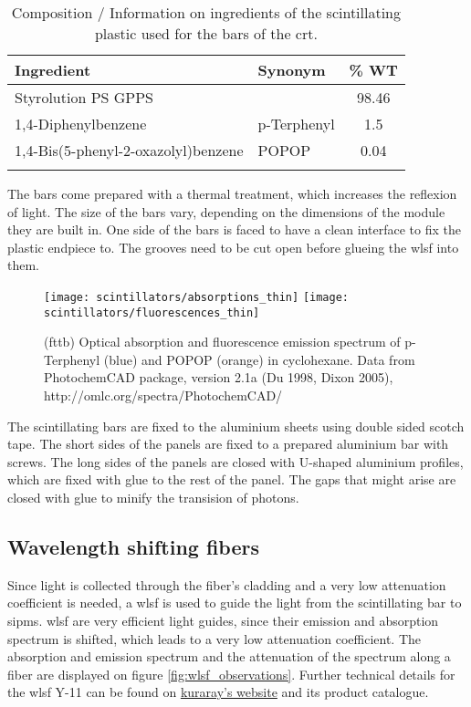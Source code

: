 \begin{table}
  \centering
  \begin{tabular}{ l l c }
    Ingredient                          & Synonym     & \% WT \\
    \hline
    Styrolution PS GPPS                 &             & 98.46 \\
    1,4-Diphenylbenzene                 & p-Terphenyl & 1.5   \\
    1,4-Bis(5-phenyl-2-oxazolyl)benzene & POPOP       & 0.04  \\
    \hline
    \\
  \end{tabular}
  \caption{%
    Composition / Information on ingredients of the scintillating plastic used for the bars of the \gls{crt}.
  }
  \label{tab:material_safety_data_sheet}
\end{table}

The bars come prepared with a thermal treatment, which increases the reflexion of light.
The size of the bars vary, depending on the dimensions of the module they are built in.
One side of the bars is faced to have a clean interface to fix the plastic endpiece to.
The grooves need to be cut open before glueing the \gls{wlsf} into them.

\begin{figure*}
  \centering
  \texttt{[image: scintillators/absorptions\_thin]}
  \texttt{[image: scintillators/fluorescences\_thin]}
  \caption{%
    (fttb)
    Optical absorption and fluorescence emission spectrum of p-Terphenyl (blue) and POPOP (orange) in cyclohexane.
    Data from PhotochemCAD package, version 2.1a (Du 1998, Dixon 2005), http://omlc.org/spectra/PhotochemCAD/
  }
  \label{fig:scintillator_graphs}
\end{figure*}

The scintillating bars are fixed to the aluminium sheets using double sided scotch tape.
The short sides of the panels are fixed to a prepared aluminium bar with screws.
The long sides of the panels are closed with U-shaped aluminium profiles, which are fixed with glue to the rest of the panel.
The gaps that might arise are closed with glue to minify the transision of photons.


\subsection{Wavelength shifting fibers}
Since light is collected through the fiber's cladding and a very low attenuation coefficient is needed, a \gls{wlsf} is used to guide the light from the scintillating bar to \glspl{sipm}.
\gls{wlsf} are very efficient light guides, since their emission and absorption spectrum is shifted, which leads to a very low attenuation coefficient.
The absorption and emission spectrum and the attenuation of the spectrum along a fiber are displayed on figure \ref{fig:wlsf_observations}.
Further technical details for the \gls{wlsf} Y-11 can be found on \href{http://kuraraypsf.jp/psf/ws.html}{kuraray's website} and its product catalogue.

